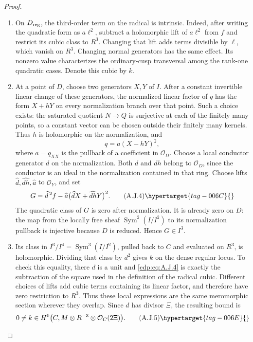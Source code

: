 \begin{proof}
\begin{enumerate}[label=\arabic*.,leftmargin=*]
\item On $D_{\rm reg}$, the third-order term on the radical is
intrinsic. Indeed, after writing the quadratic form as
$a\ell^2$, subtract a holomorphic lift of $a\ell^2$ from
$f$ and restrict its cubic class to $R^3$. Changing that lift
adds terms divisible by $\ell$, which vanish on $R^3$.
Changing normal generators has the same effect. Its nonzero
value characterizes the ordinary-cusp transversal among the
rank-one quadratic cases. Denote this cubic by $k$.

\item At a point of $D$, choose two generators $X,Y$ of $I$. After a constant invertible linear
change of these generators, the normalized linear factor of
$q$ has the form $X+hY$ on every normalization branch over
that point. Such a choice exists: the saturated quotient
$N\to Q$ is surjective at each of the finitely many points,
so a constant vector can be chosen outside their finitely
many kernels. Thus $h$ is holomorphic on the normalization,
and
\[
 q=a(X+hY)^2,
\]
where $a=q_{XX}$ is the pullback of a coefficient
in $\mathcal O_D$. Choose a local conductor generator $d$
on the normalization. Both $d$ and $dh$ belong to
$\mathcal O_D$, since the conductor is an ideal in the
normalization contained in that ring. Choose lifts
$\widehat d,\widehat{dh},\widehat a$ to $\mathcal O_Y$,
and set
\[
 G=\widehat d^{\,2} f-
    \widehat a\bigl(\widehat d X+\widehat{dh}Y\bigr)^2.
                                                        \tag{A.J.4}\hypertarget{tag-006C}{}\label{cdp:eq:A.J.4}
\]
The quadratic class of $G$ is zero after normalization.
It is already zero on $D$: the map from the locally free
sheaf $\operatorname{Sym}^2(I/I^2)$ to its normalization
pullback is injective because $D$ is reduced. Hence
$G\in I^3$.

\item Its class in $I^3/I^4=\operatorname{Sym}^3(I/I^2)$,
pulled back to $C$ and evaluated on $R^3$, is holomorphic.
Dividing that class by $d^2$ gives $k$ on the dense regular
locus. To check this equality, there $d$ is a unit and
\eqref{cdp:eq:A.J.4} is exactly the subtraction of the square used in the
definition of the radical cubic. Different choices of lifts
add cubic terms containing its linear factor, and therefore
have zero restriction to $R^3$. Thus these local expressions
are the same meromorphic section wherever they overlap.
Since $d$ has divisor $\Xi$, the resulting bound is
\[
 0\ne k\in H^0\bigl(C,M\otimes R^{-3}
                               \otimes\mathcal O_C(2\Xi)\bigr).
                                                        \tag{A.J.5}\hypertarget{tag-006E}{}\label{cdp:eq:A.J.5}
\]


\end{enumerate}
\end{proof}
